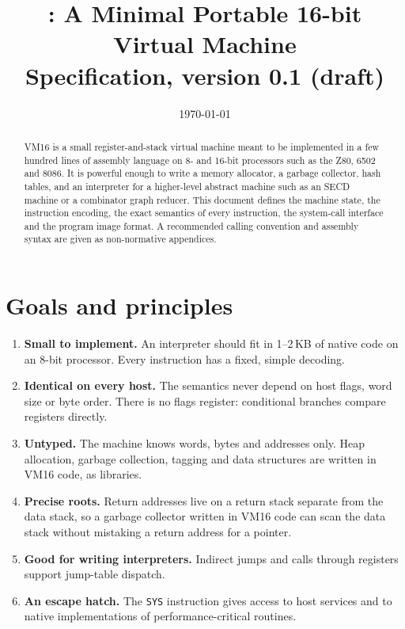 \documentclass[11pt,a4paper]{article}
\title{\vm{}: A Minimal Portable 16-bit Virtual Machine\\[4pt]
\large Specification, version 0.1 (draft)}
\author{}
\date{\today}
\newcommand{\vm}{VM16}
\newcommand{\op}[1]{\texttt{#1}}
\begin{document}
\maketitle

\begin{abstract}
\noindent
\vm{} is a small register-and-stack virtual machine meant to be implemented
in a few hundred lines of assembly language on 8- and 16-bit processors such as
the Z80, 6502 and 8086. It is powerful enough to write a memory allocator, a
garbage collector, hash tables, and an interpreter for a higher-level abstract
machine such as an SECD machine or a combinator graph reducer. This document
defines the machine state, the instruction encoding, the exact semantics of
every instruction, the system-call interface and the program image format. A
recommended calling convention and assembly syntax are given as non-normative
appendices.
\end{abstract}

\tableofcontents

\section{Goals and principles}

\begin{enumerate}[label=\textbf{P\arabic*.}, leftmargin=2.2em]
\item \textbf{Small to implement.} An interpreter should fit in 1--2\,KB of
  native code on an 8-bit processor. Every instruction has a fixed,
  simple decoding.
\item \textbf{Identical on every host.} The semantics never depend on host
  flags, word size or byte order. There is no flags register: conditional
  branches compare registers directly.
\item \textbf{Untyped.} The machine knows words, bytes and addresses only.
  Heap allocation, garbage collection, tagging and data structures are
  written in \vm{} code, as libraries.
\item \textbf{Precise roots.} Return addresses live on a return stack
  separate from the data stack, so a garbage collector written in \vm{} code
  can scan the data stack without mistaking a return address for a pointer.
\item \textbf{Good for writing interpreters.} Indirect jumps and calls
  through registers support jump-table dispatch.
\item \textbf{An escape hatch.} The \op{SYS} instruction gives access to host
  services and to native implementations of performance-critical routines.
\end{enumerate}
\end{document}
